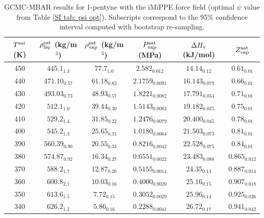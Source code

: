 \documentclass[journal=jctc,manuscript=article]{achemso}
\begin{document}
\begin{table}[htb!]
	\caption{GCMC-MBAR results for 1-pentyne with the iMiPPE force field (optimal $\psi$ value from Table \ref{SI tab: psi opt}). Subscripts correspond to the 95\% confidence interval computed with bootstrap re-sampling.}
	\begin{center}
		\begin{tabular}{|c|c|c|c|c|c|}
			\hline
			$T^{\rm sat}$ (K) & $\rho_{\rm liq}^{\rm sat}$ (kg/m$^3$) & $\rho_{\rm vap}^{\rm sat}$ (kg/m$^3$) & $P_{\rm vap}^{\rm sat}$ (MPa) & $\Delta H_{\rm v}$ (kJ/mol) & $Z_{\rm vap}^{\rm sat}$ \\ \hline
			450 & $445.1_{1.3}$ & $77.7_{1.0}$ & $2.582_{0.012}$ & $14.14_{0.12}$ & $0.61_{0.01}$ \\
			440 & $471.10_{0.57}$ & $61.18_{0.83}$ & $2.1759_{0.0091}$ & $16.143_{0.079}$ & $0.66_{0.01}$ \\
			430 & $493.03_{0.73}$ & $48.93_{0.57}$ & $1.8221_{0.0082}$ & $17.791_{0.054}$ & $0.71_{0.01}$ \\
			420 & $512.1_{1.0}$ & $39.44_{0.30}$ & $1.5143_{0.0083}$ & $19.182_{0.025}$ & $0.75_{0.01}$ \\
			410 & $529.2_{1.4}$ & $31.85_{0.22}$ & $1.2476_{0.0079}$ & $20.400_{0.045}$ & $0.78_{0.01}$ \\
			400 & $545.2_{1.3}$ & $25.65_{0.31}$ & $1.0180_{0.0064}$ & $21.503_{0.073}$ & $0.81_{0.01}$ \\
			390 & $560.39_{0.90}$ & $20.55_{0.33}$ & $0.8216_{0.0042}$ & $22.528_{0.075}$ & $0.84_{0.01}$ \\
			380 & $574.87_{0.92}$ & $16.34_{0.27}$ & $0.6551_{0.0022}$ & $23.483_{0.088}$ & $0.865_{0.012}$ \\
			370 & $588.2_{1.7}$ & $12.87_{0.20}$ & $0.5155_{0.0014}$ & $24.35_{0.13}$ & $0.887_{0.014}$ \\
			360 & $600.8_{2.1}$ & $10.03_{0.16}$ & $0.4000_{0.0020}$ & $25.16_{0.15}$ & $0.907_{0.018}$ \\
			350 & $613.6_{1.5}$ & $7.72_{0.15}$ & $0.3052_{0.0029}$ & $25.96_{0.14}$ & $0.925_{0.026}$ \\
			340 & $626.2_{1.2}$ & $5.86_{0.16}$ & $0.2288_{0.0041}$ & $26.72_{0.17}$ & $0.941_{0.042}$ \\
			\hline
		\end{tabular}
	\end{center}
\end{table}
\end{document}
